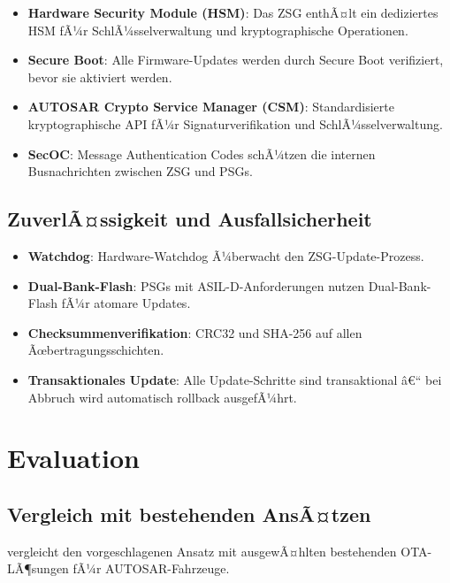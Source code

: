 ﻿\documentclass[12pt,a4paper,twoside]{article}
\begin{document}
\begin{itemize}
  \item \textbf{Hardware Security Module (HSM)}: Das ZSG enthÃ¤lt ein
    dediziertes HSM fÃ¼r SchlÃ¼sselverwaltung und kryptographische Operationen.
  \item \textbf{Secure Boot}: Alle Firmware-Updates werden durch Secure Boot
    verifiziert, bevor sie aktiviert werden.
  \item \textbf{AUTOSAR Crypto Service Manager (CSM)}: Standardisierte
    kryptographische API fÃ¼r Signaturverifikation und SchlÃ¼sselverwaltung.
  \item \textbf{SecOC}: Message Authentication Codes schÃ¼tzen die
    internen Busnachrichten zwischen ZSG und PSGs.
\end{itemize}

\subsection{ZuverlÃ¤ssigkeit und Ausfallsicherheit}

\begin{itemize}
  \item \textbf{Watchdog}: Hardware-Watchdog Ã¼berwacht den ZSG-Update-Prozess.
  \item \textbf{Dual-Bank-Flash}: PSGs mit ASIL-D-Anforderungen nutzen
    Dual-Bank-Flash fÃ¼r atomare Updates.
  \item \textbf{Checksummenverifikation}: CRC32 und SHA-256 auf allen
    Ãœbertragungsschichten.
  \item \textbf{Transaktionales Update}: Alle Update-Schritte sind
    transaktional â€“ bei Abbruch wird automatisch rollback ausgefÃ¼hrt.
\end{itemize}


\section{Evaluation}
\label{sec:evaluation}


\subsection{Vergleich mit bestehenden AnsÃ¤tzen}

 vergleicht den vorgeschlagenen Ansatz mit
ausgewÃ¤hlten bestehenden OTA-LÃ¶sungen fÃ¼r AUTOSAR-Fahrzeuge.
\end{document}
